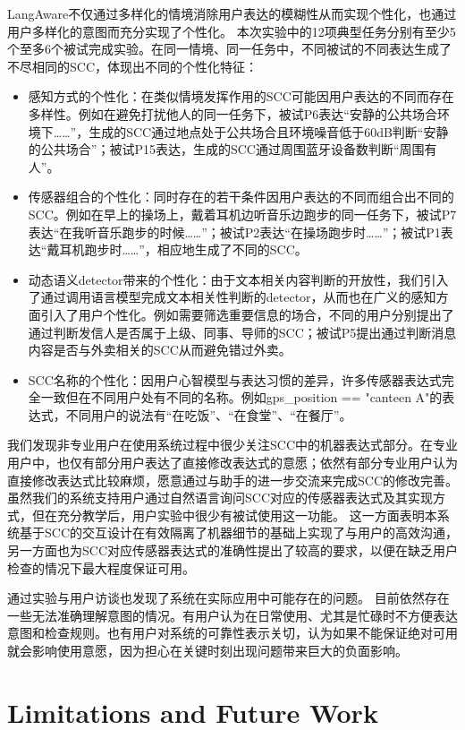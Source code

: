 LangAware不仅通过多样化的情境消除用户表达的模糊性从而实现个性化，也通过用户多样化的意图而充分实现了个性化。
本次实验中的12项典型任务分别有至少5个至多6个被试完成实验。在同一情境、同一任务中，不同被试的不同表达生成了不尽相同的SCC，体现出不同的个性化特征：
\begin{itemize}
    \item 感知方式的个性化：在类似情境发挥作用的SCC可能因用户表达的不同而存在多样性。例如在避免打扰他人的同一任务下，被试P6表达“安静的公共场合环境下……”，生成的SCC通过地点处于公共场合且环境噪音低于60dB判断“安静的公共场合”；被试P15表达，生成的SCC通过周围蓝牙设备数判断“周围有人”。
    \item 传感器组合的个性化：同时存在的若干条件因用户表达的不同而组合出不同的SCC。例如在早上的操场上，戴着耳机边听音乐边跑步的同一任务下，被试P7表达“在我听音乐跑步的时候……”；被试P2表达“在操场跑步时……”；被试P1表达“戴耳机跑步时……”，相应地生成了不同的SCC。
    \item 动态语义detector带来的个性化：由于文本相关内容判断的开放性，我们引入了通过调用语言模型完成文本相关性判断的detector，从而也在广义的感知方面引入了用户个性化。例如需要筛选重要信息的场合，不同的用户分别提出了通过判断发信人是否属于上级、同事、导师的SCC；被试P5提出通过判断消息内容是否与外卖相关的SCC从而避免错过外卖。
    \item SCC名称的个性化：因用户心智模型与表达习惯的差异，许多传感器表达式完全一致但在不同用户处有不同的名称。例如gps\_position == "canteen A"的表达式，不同用户的说法有“在吃饭”、“在食堂”、“在餐厅”。
\end{itemize}

我们发现非专业用户在使用系统过程中很少关注SCC中的机器表达式部分。在专业用户中，也仅有部分用户表达了直接修改表达式的意愿；依然有部分专业用户认为直接修改表达式比较麻烦，愿意通过与助手的进一步交流来完成SCC的修改完善。
虽然我们的系统支持用户通过自然语言询问SCC对应的传感器表达式及其实现方式，但在充分教学后，用户实验中很少有被试使用这一功能。
这一方面表明本系统基于SCC的交互设计在有效隔离了机器细节的基础上实现了与用户的高效沟通，
另一方面也为SCC对应传感器表达式的准确性提出了较高的要求，以便在缺乏用户检查的情况下最大程度保证可用。

通过实验与用户访谈也发现了系统在实际应用中可能存在的问题。
目前依然存在一些无法准确理解意图的情况。有用户认为在日常使用、尤其是忙碌时不方便表达意图和检查规则。也有用户对系统的可靠性表示关切，认为如果不能保证绝对可用就会影响使用意愿，因为担心在关键时刻出现问题带来巨大的负面影响。

\section{Limitations and Future Work}

